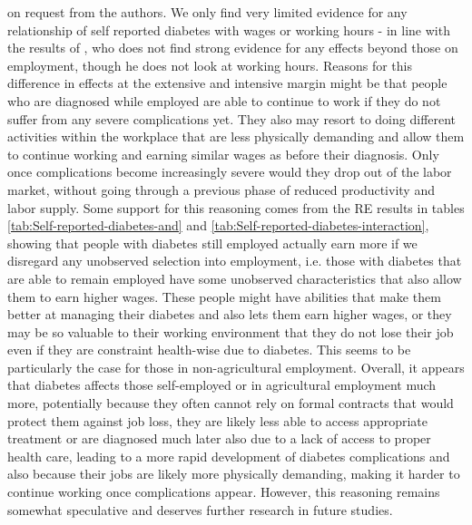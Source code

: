\documentclass[12pt,english,british]{article}
\begin{document}
{on request from the authors.} We only find very limited evidence for any relationship of self reported diabetes with wages or working hours - in line with the results of \citet{Minor2013}, who does not find strong evidence for any effects beyond those on employment, though he does not look at working hours. Reasons for this difference in effects at the extensive and intensive margin might be that people who are diagnosed while employed are able to continue to work if they do not suffer from any severe complications yet. They also may resort to doing different activities within the workplace that are less physically demanding and allow them to continue working and earning similar wages as before their diagnosis. Only once complications become increasingly severe would they drop out of the labor market, without going through a previous phase of reduced productivity and labor supply. Some support for this reasoning comes from the \ac{RE} results in tables \ref{tab:Self-reported-diabetes-and} and \ref{tab:Self-reported-diabetes-interaction}, showing that people with diabetes still employed actually earn more if we disregard any unobserved selection into employment, i.e. those with diabetes that are able to remain employed have some unobserved characteristics that also allow them to earn higher wages. These people might have abilities that make them better at managing their diabetes and also lets them earn higher wages, or they may be so valuable to their working environment that they do not lose their job even if they are constraint health-wise due to diabetes. This seems to be particularly the case for those in non-agricultural employment. Overall, it appears that diabetes affects those self-employed or in agricultural employment much more, potentially because they often cannot rely on formal contracts that would protect them against job loss, they are likely less able to access appropriate treatment or are diagnosed much later also due to a lack of access to proper health care, leading to a more rapid development of diabetes complications and also because their jobs are likely more physically demanding, making it harder to continue working once complications appear. However, this reasoning remains somewhat speculative and deserves further research in future studies.
\end{document}
